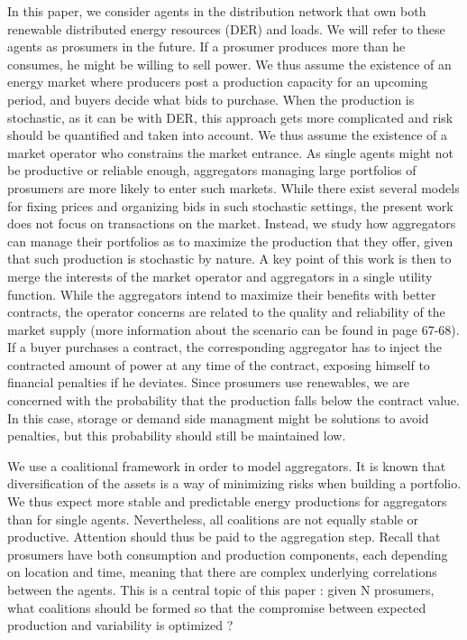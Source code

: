 \documentclass[journal]{IEEEtran}
\begin{document}
In this paper, we consider agents in the distribution network that own both renewable distributed energy resources (DER) and loads. We will refer to these agents as prosumers \cite{Rathnayaka2012} in the future. If a prosumer produces more than he consumes, he might be willing to sell power. We thus assume the existence of an energy market where producers post a production capacity for an upcoming period, and buyers decide what bids to purchase. When the production is stochastic, as it can be with DER, this approach gets more complicated and risk should be quantified and taken into account. We thus assume the existence of a market operator who constrains the market entrance. As single agents might not be productive or reliable enough, aggregators managing large portfolios of prosumers are more likely to enter such markets. While there exist several models for fixing prices and organizing bids in such stochastic settings, the present work does not focus on transactions on the market. Instead, we study how aggregators can manage their portfolios as to maximize the production that they offer, given that such production is stochastic by nature. A key point of this work is then to merge the interests of the market operator and aggregators in a single utility function. While the aggregators intend to maximize their benefits with better contracts, the operator concerns are related to the quality and reliability of the market supply (more information about the scenario can be found in \cite{Europe} page 67-68). If a buyer purchases a contract, the corresponding aggregator has to inject the contracted amount of power at any time of the contract, exposing himself to financial penalties if he deviates. Since prosumers use renewables, we are concerned with the probability that the production falls below the contract value. In this case, storage or demand side managment might be solutions to avoid penalties, but this probability should still be maintained low. 

We use a coalitional framework in order to model aggregators. It is known that diversification of the assets is a way of minimizing risks when building a portfolio. We thus expect more stable and predictable energy productions for aggregators than for single agents. Nevertheless, all coalitions are not equally stable or productive. Attention should thus be paid to the aggregation step. Recall that prosumers have both consumption and production components, each depending on location and time, meaning that there are complex underlying correlations between the agents. This is a central topic of this paper : given N prosumers, what coalitions should be formed so that the compromise between expected production and variability is optimized ?
\end{document}
